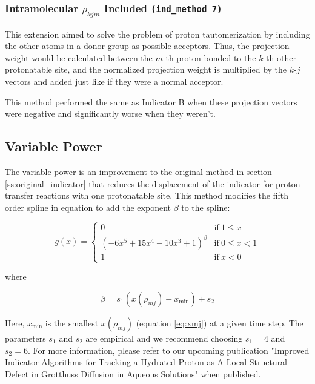 \documentclass{article}
\begin{document}
\subsubsection{Intramolecular $\rho_{kjm}$ Included \texttt{(ind\_method 7)}}\label{ss:indicator7}
This extension aimed to solve the problem of proton tautomerization by including the other atoms in a donor group as possible acceptors.
Thus, the projection weight would be calculated between the $m$-th proton bonded to the $k$-th other protonatable site, and the normalized projection weight is multiplied by the $k$-$j$ vectors and added just like if they were a normal acceptor.

This method performed the same as Indicator B when these projection vectors were negative and significantly worse when they weren't.


\subsection{Variable Power}\label{ss:indicator12}
The variable power is an improvement to the original method in section \ref{ss:original_indicator} that reduces the displacement of the indicator for proton transfer reactions with one protonatable site.
This method modifies the fifth order spline in equation to add the exponent $\beta$ to the spline:

\begin{equation} \label{eq:gofx_vpow}
g(x) = \begin{cases}
0
& \mathrm{if}\ 1 \leq x \\
\left( -6x^5 + 15x^4 - 10x^3 + 1 \right) ^ \beta
& \mathrm{if}\  0 \leq x < 1 \\
1
& \mathrm{if}\ x < 0 
\end{cases}
\end{equation}

where

\begin{equation}
\beta = s_1 \left( x(\rho_{mj}) - x_{\mathrm{min}} \right) + s_2
\end{equation}

Here, $x_{\mathrm{min}}$ is the smallest $x(\rho_{mj})$ (equation \ref{eq:xmj}) at a given time step.
The parameters $s_1$ and $s_2$ are empirical and we recommend choosing $s_1 = 4$ and $s_2 = 6$.
For more information, please refer to our upcoming publication "Improved Indicator Algorithms for Tracking a Hydrated Proton as A Local Structural Defect in Grotthuss Diffusion in Aqueous Solutions" when published.
\end{document}
